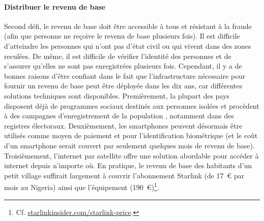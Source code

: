\documentclass[a5paper,french,openany]{memoir}
\begin{document}
\paragraph{Distribuer le revenu de base}
Second défi, le revenu de base doit être accessible à tous et résistant à la fraude (afin que personne ne reçoive le revenu de base plusieurs fois). Il est difficile d'atteindre les personnes qui n'ont pas d'état civil ou qui vivent dans des zones reculées. De même, il est difficile de vérifier l'identité des personnes et de s'assurer qu'elles ne sont pas enregistrées plusieurs fois. Cependant, il y a de bonnes raisons d'être confiant dans le fait que l'infrastructure nécessaire pour fournir un revenu de base peut être déployée dans les dix ans, car différentes solutions techniques sont disponibles. Premièrement, la plupart des pays disposent déjà de programmes sociaux destinés aux personnes isolées et procèdent à des campagnes d'enregistrement de la population%
, notamment dans des registres électoraux. %
Deuxièmement, les smartphones peuvent désormais être utilisés comme moyen de paiement et pour l'identification biométrique (et le coût d'un smartphone serait couvert par seulement quelques mois de revenu de base). %
Troisièmement, %
l'internet par satellite offre une solution abordable pour accéder à internet depuis n'importe où. En pratique, le revenu de base des habitants d'un petit village suffirait largement à couvrir l'abonnement Starlink (de 17~\euro{} par mois au Nigeria) ainsi que l'équipement (190~\euro{})\footnote{Cf. \href{https://starlinkinsider.com/starlink-price/}{starlinkinsider.com/starlink-price}.}. %
\end{document}

